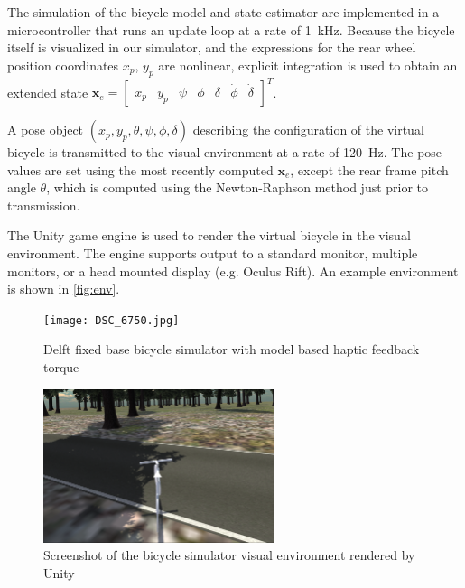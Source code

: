 \documentclass{icsc}
\newcommand{\x}{x_{p}}
\newcommand{\y}{y_{p}}
\newcommand{\pitch}{\theta}
\newcommand{\yaw}{\psi}
\newcommand{\roll}{\phi}
\newcommand{\steer}{\delta}
\newcommand{\rollRate}{\dot{\phi}}
\newcommand{\steerRate}{\dot{\delta}}
\begin{document}
The simulation of the bicycle model and state estimator are implemented in a microcontroller that runs an update loop at
a rate of \SI{1}{\kilo\hertz}.
Because the bicycle itself is visualized in our simulator, and the expressions for the rear wheel position coordinates
$\x$, $\y$ are nonlinear, explicit integration is used to obtain an extended state
$\bm{x}_e = \begin{bmatrix} \x & \y & \yaw & \roll & \steer & \rollRate & \steerRate \end{bmatrix}^T$.

A pose object $\left( \x, \y, \pitch, \yaw, \roll, \steer \right)$ describing the configuration of the virtual bicycle
is transmitted to the visual environment at a rate of \SI{120}{\hertz}.
The pose values are set using the most recently computed $\bm{x}_e$, except the rear frame pitch angle $\pitch$, which is computed
using the Newton-Raphson method just prior to transmission.

The Unity game engine is used to render the virtual bicycle in the visual environment.
The engine supports output to a standard monitor, multiple monitors, or a head mounted display (e.g. Oculus Rift).
An example environment is shown in \autoref{fig:env}.

\begin{figure}
\centering
\begin{minipage}[t]{0.45\textwidth}
    \centering
    \captionsetup{width=\linewidth}
    \texttt{[image: DSC\_6750.jpg]}
    \caption{Delft fixed base bicycle simulator with model based haptic feedback torque}
    \label{fig:mech}
\end{minipage}
\hfill
\begin{minipage}[t]{0.45\textwidth}
    \centering
    \captionsetup{width=\linewidth}
    \includegraphics[height=4.5cm]{unity_env.png}
    \caption{Screenshot of the bicycle simulator visual environment rendered by Unity}
    \label{fig:env}
\end{minipage}
\end{figure}
\end{document}
